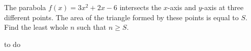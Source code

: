 The parabola ${f(x)=3x^{2}+2x-6}$ intersects the $x$-axis and $y$-axis at three different points. The area of the triangle formed by these points is equal to $S$. Find the least whole $n$ such that $n\geq S$.

\begin{answer}
to do
\end{answer}
